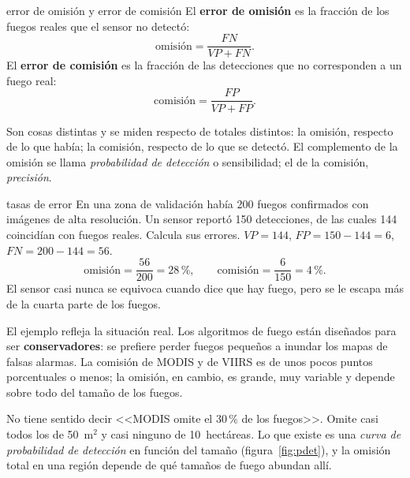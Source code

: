 \begin{definicion}{error de omisión y error de comisión}
El \textbf{error de omisión} es la fracción de los fuegos reales que el sensor no detectó:
\[
  \text{omisión} = \frac{FN}{VP + FN}.
\]
El \textbf{error de comisión} es la fracción de las detecciones que no corresponden a un fuego
real:
\[
  \text{comisión} = \frac{FP}{VP + FP}.
\]
\end{definicion}

Son cosas distintas y se miden respecto de totales distintos: la omisión, respecto de lo que
había; la comisión, respecto de lo que se detectó. El complemento de la omisión se llama
\emph{probabilidad de detección} o sensibilidad; el de la comisión, \emph{precisión}.

\begin{ejemplo}{tasas de error}
En una zona de validación había 200 fuegos confirmados con imágenes de alta resolución. Un
sensor reportó 150 detecciones, de las cuales 144 coincidían con fuegos reales. Calcula sus
errores.
\solucion $VP = 144$, $FP = 150 - 144 = 6$, $FN = 200 - 144 = 56$.
\[
 \text{omisión} = \frac{56}{200} = 28\,{}\%, \qquad \text{comisión} = \frac{6}{150} = 4\,{}\%.
\]
El sensor casi nunca se equivoca cuando dice que hay fuego, pero se le escapa más de la cuarta
parte de los fuegos.
\end{ejemplo}

El ejemplo refleja la situación real. Los algoritmos de fuego están diseñados para ser
\textbf{conservadores}: se prefiere perder fuegos pequeños a inundar los mapas de falsas
alarmas. La comisión de MODIS y de VIIRS es de unos pocos puntos porcentuales o menos; la
omisión, en cambio, es grande, muy variable y depende sobre todo del tamaño de los fuegos.

\begin{intuicion}
No tiene sentido decir <<MODIS omite el 30\,{}\% de los fuegos>>. Omite casi todos los de
50~m$^2$ y casi ninguno de 10~hectáreas. Lo que existe es una \emph{curva de probabilidad de
detección} en función del tamaño (figura~\ref{fig:pdet}), y la omisión total en una región
depende de qué tamaños de fuego abundan allí.
\end{intuicion}

